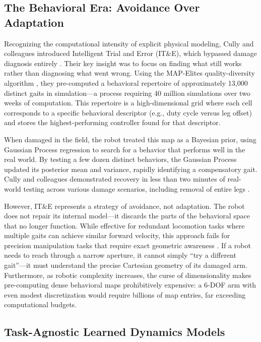 \documentclass[12pt,a4paper,oneside]{report}
\begin{document}
\subsection{The Behavioral Era: Avoidance Over Adaptation}

Recognizing the computational intensity of explicit physical modeling, Cully and colleagues introduced Intelligent Trial and Error (IT\&E), which bypassed damage diagnosis entirely \cite{cully2015robots}. Their key insight was to focus on finding what still works rather than diagnosing what went wrong. Using the MAP-Elites quality-diversity algorithm \cite{mouret2015illuminating}, they pre-computed a behavioral repertoire of approximately 13,000 distinct gaits in simulation---a process requiring 40 million simulations over two weeks of computation. This repertoire is a high-dimensional grid where each cell corresponds to a specific behavioral descriptor (e.g., duty cycle versus leg offset) and stores the highest-performing controller found for that descriptor.

When damaged in the field, the robot treated this map as a Bayesian prior, using Gaussian Process regression to search for a behavior that performs well in the real world. By testing a few dozen distinct behaviors, the Gaussian Process updated its posterior mean and variance, rapidly identifying a compensatory gait. Cully and colleagues demonstrated recovery in less than two minutes of real-world testing across various damage scenarios, including removal of entire legs \cite{cully2015robots}.

However, IT\&E represents a strategy of avoidance, not adaptation. The robot does not repair its internal model---it discards the parts of the behavioral space that no longer function. While effective for redundant locomotion tasks where multiple gaits can achieve similar forward velocity, this approach fails for precision manipulation tasks that require exact geometric awareness \cite{kwiatkowski2019task}. If a robot needs to reach through a narrow aperture, it cannot simply ``try a different gait''---it must understand the precise Cartesian geometry of its damaged arm. Furthermore, as robotic complexity increases, the curse of dimensionality makes pre-computing dense behavioral maps prohibitively expensive: a 6-DOF arm with even modest discretization would require billions of map entries, far exceeding computational budgets.

\subsection{Task-Agnostic Learned Dynamics Models}
\end{document}
